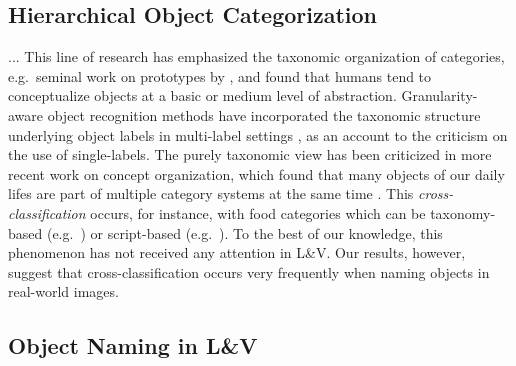 \subsection{Hierarchical Object Categorization} 
... This line of research has emphasized the taxonomic organization of categories, e.g.\ seminal work on prototypes by ,  and found that humans tend to conceptualize objects at a basic or medium level of abstraction.
Granularity-aware object recognition methods have incorporated the taxonomic structure underlying object labels in multi-label settings \cite{deng2014large,wang2014poodle,peterson2018learning}, as an account to the criticism on the use of single-labels. 
The purely taxonomic view has been criticized in more recent work on concept organization, which found that many objects of our daily lifes are part of multiple category systems at the same time \cite{ross1999food,SHAFTO20111}. 
This \textit{cross-classification} occurs, for instance, with food categories which can be taxonomy-based (e.g.\  ) or script-based (e.g.\  ).
To the best of our knowledge, this phenomenon has not received any attention in L\&V.
Our results, however, suggest that cross-classification occurs very frequently when naming objects in real-world images.


\subsection{Object Naming in L\&V} 

